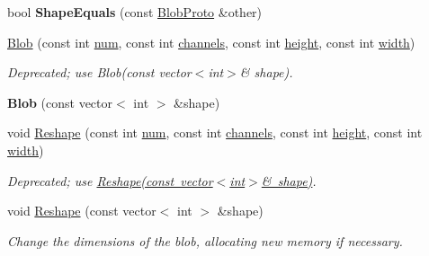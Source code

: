 \begin{DoxyCompactItemize}
\mbox{\label{classcaffe_1_1_blob_aaf5af1d79ac66f15dd5ebe504b36efcd}} 
bool {\bfseries Shape\+Equals} (const \mbox{\hyperlink{classcaffe_1_1_blob_proto}{Blob\+Proto}} \&other)
\item 
\mbox{\label{classcaffe_1_1_blob_a379df830aad9b3cae253e1ddb0863844}} 
\mbox{\hyperlink{classcaffe_1_1_blob_a379df830aad9b3cae253e1ddb0863844}{Blob}} (const int \mbox{\hyperlink{classcaffe_1_1_blob_a80ed3eddf98ffd408e9a627b1a7c2a9e}{num}}, const int \mbox{\hyperlink{classcaffe_1_1_blob_ae48c8e9f0a0b66b041e47bf37ed04471}{channels}}, const int \mbox{\hyperlink{classcaffe_1_1_blob_a18af535af43f4e9f85bd1e520886276f}{height}}, const int \mbox{\hyperlink{classcaffe_1_1_blob_afbdc067c69e6b9bd6880a73c13db2ec6}{width}})
\begin{DoxyCompactList}\small\item\em Deprecated; use {\ttfamily Blob(const vector$<$int$>$\& shape)}. \end{DoxyCompactList}\item 
\mbox{\label{classcaffe_1_1_blob_a2268ef004df012760d300465a28f0f68}} 
{\bfseries Blob} (const vector$<$ int $>$ \&shape)
\item 
\mbox{\label{classcaffe_1_1_blob_ad0e0a9a4f49478e89161c6afe4e341a0}} 
void \mbox{\hyperlink{classcaffe_1_1_blob_ad0e0a9a4f49478e89161c6afe4e341a0}{Reshape}} (const int \mbox{\hyperlink{classcaffe_1_1_blob_a80ed3eddf98ffd408e9a627b1a7c2a9e}{num}}, const int \mbox{\hyperlink{classcaffe_1_1_blob_ae48c8e9f0a0b66b041e47bf37ed04471}{channels}}, const int \mbox{\hyperlink{classcaffe_1_1_blob_a18af535af43f4e9f85bd1e520886276f}{height}}, const int \mbox{\hyperlink{classcaffe_1_1_blob_afbdc067c69e6b9bd6880a73c13db2ec6}{width}})
\begin{DoxyCompactList}\small\item\em Deprecated; use {\ttfamily \mbox{\hyperlink{classcaffe_1_1_blob_ac9ce456aa623ff3f4d24225a0db14404}{Reshape(const vector$<$int$>$\& shape)}}}. \end{DoxyCompactList}\item 
void \mbox{\hyperlink{classcaffe_1_1_blob_ac9ce456aa623ff3f4d24225a0db14404}{Reshape}} (const vector$<$ int $>$ \&shape)
\begin{DoxyCompactList}\small\item\em Change the dimensions of the blob, allocating new memory if necessary. \end{DoxyCompactList}\item 

\end{DoxyCompactItemize}
